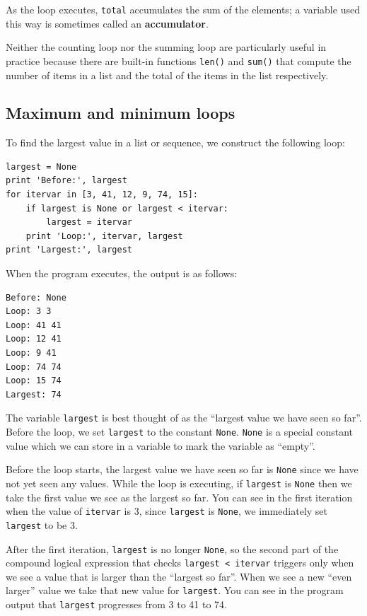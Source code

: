 \documentclass[10pt]{book}
\begin{document}
As the loop executes, {\tt total} accumulates the sum of the
elements; a variable used this way is sometimes called an
{\bf accumulator}.

Neither the counting loop nor the summing loop are particularly 
useful in practice because there are built-in functions 
{\tt len()} and {\tt sum()} that compute the number of 
items in a list and the total of the items in the list
respectively.

\subsection{Maximum and minimum loops}

\label{maximumloop}
To find the largest value in a list or sequence, we construct the
following loop:

\beforeverb
\begin{verbatim}
largest = None
print 'Before:', largest
for itervar in [3, 41, 12, 9, 74, 15]:
    if largest is None or largest < itervar:
        largest = itervar
    print 'Loop:', itervar, largest
print 'Largest:', largest
\end{verbatim}
\afterverb
%
When the program executes, the output is as follows:

\beforeverb
\begin{verbatim}
Before: None
Loop: 3 3
Loop: 41 41
Loop: 12 41
Loop: 9 41
Loop: 74 74
Loop: 15 74
Largest: 74
\end{verbatim}
\afterverb
%
The variable {\tt largest} is best thought of as 
the ``largest value we have seen so far''.
Before the loop, we set {\tt largest} to the constant {\tt None}.  
{\tt None} is a special constant value which we can 
store in a variable to mark 
the variable as ``empty''.  

Before the loop starts, the largest value we have seen so far 
is {\tt None} since we have not yet seen any values.  While the 
loop is executing, if {\tt largest} is {\tt None} then we take
the first value we see as the largest so far.   You can see in 
the first iteration when the value of {\tt itervar} is 3,
since {\tt largest} is {\tt None}, we immediately set 
{\tt largest} to be 3.

After the first iteration, {\tt largest} is no longer {\tt None},
so the second part of the compound logical expression that checks
{\tt largest < itervar} triggers only when we see a value that is
larger than the ``largest so far''.  When we see a new ``even larger''
value we take that new value for {\tt largest}.  You can see in the 
program output that {\tt largest} progresses from 3 to 41 to 74.
\end{document}

